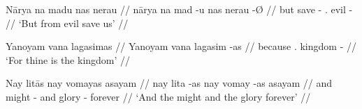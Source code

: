 \documentclass[12pt,paper=a4]{scrartcl}
\begin{document}
\ex %
\begingl
    \glpreamble Nārya na madu nas nerau //
    \gla nārya na mad -u nas nerau -Ø //
    \glb but \GenT{} save -\Imp{} \Fpl{}.\Parg{} evil -\Top{} //
    \glft `But from evil save us' //
\endgl
\xe

\ex %
\begingl
    \glpreamble Yanoyam vana lagasimas //
    \gla Yanoyam vana lagasim -as //
    \glb because \Ssg{}.\Gen{} kingdom -\Parg{} //
    \glft `For thine is the kingdom' //
\endgl
\xe

\ex %
\begingl
    \glpreamble Nay litās nay vomayas asayam //
    \gla nay lita -as nay vomay -as asayam //
    \glb and might -\Parg{} and glory -\Parg{} forever //
    \glft `And the might and the glory forever' //
\endgl
\xe


\vfill
\printbibliography
\end{document}
